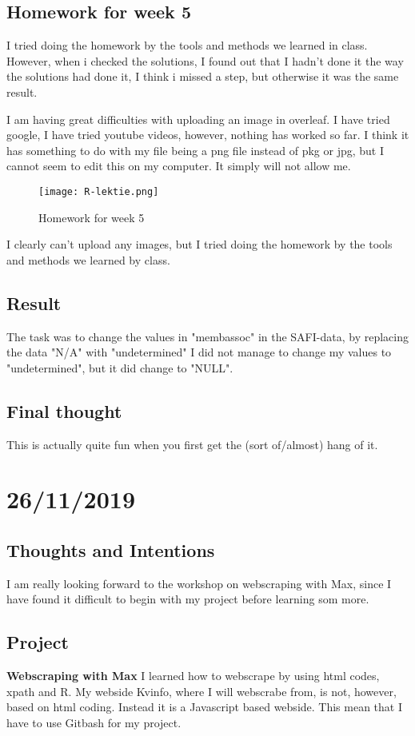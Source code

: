 \documentclass{article}
\begin{document}
\begin{itemize}
\subsection{Homework for week 5}

I tried doing the homework by the tools and methods we learned in class. However, when i checked the solutions, I found out that I hadn't done it the way the solutions had done it, I think i missed a step, but otherwise it was the same result. 

I am having great difficulties with uploading an image in overleaf. I have tried google, I have tried youtube videos, however, nothing has worked so far. I think it has something to do with my file being a png file instead of pkg or jpg, but I cannot seem to edit this on my computer. It simply will not allow me. 

\begin{figure}[htp]
    \centering
    \texttt{[image: R-lektie.png]}
    \usepackage{graphicx}
    \caption{Homework for week 5}
    \label{R-scipt figure}
\end{figure}
I clearly can't upload any images, but I tried doing the homework by the tools and methods we learned by class. 

\subsection{Result}
The task was to change the values in "membassoc" in the SAFI-data, by replacing the data "N/A" with "undetermined"
I did not manage to change my values to "undetermined", but it did change to "NULL". 

\subsection{Final thought}
This is actually quite fun when you first get the (sort of/almost) hang of it. 


\section{26/11/2019}
\subsection{Thoughts and Intentions}
I am really looking forward to the workshop on webscraping with Max, since I have found it difficult to begin with my project before learning som more.

\subsection{Project}
\textbf{Webscraping with Max}
I learned how to webscrape by using html codes, xpath and R. My webside Kvinfo, where I will webscrabe from, is not, however, based on html coding. Instead it is a Javascript based webside. This mean that I have to use Gitbash for my project. 


\end{itemize}
\end{document}
